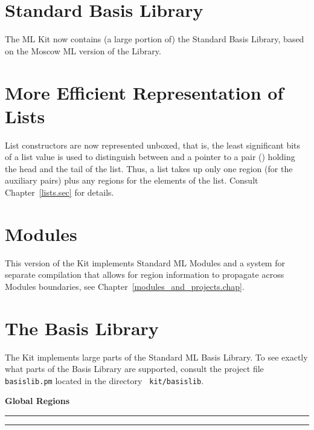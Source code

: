 \documentclass[12pt]{book}
\begin{document}
\section{Standard Basis Library}
The ML Kit now contains (a large portion of) the Standard Basis
Library, based on the Moscow ML version of the Library.
\section{More Efficient Representation of Lists}
 List constructors are now represented unboxed, that is,
the least significant bits of a list value is used to distinguish
between  and a pointer to a pair (\boxml{::}) holding the
head and the tail of the list. Thus, a list takes up only one region
(for the auxiliary pairs) plus any regions for the elements of the
list. Consult Chapter~\ref{lists.sec} for details.

\section{Modules}
This version of the Kit implements Standard ML Modules and a system
for separate compilation that allows for region information to
propagate across Modules boundaries, see
Chapter~\ref{modules_and_projects.chap}.

\section{The Basis Library}
The Kit implements large parts of the Standard ML Basis Library. To
see exactly what parts of the Basis Library are supported, consult the
project file {\tt basislib.pm} located in the directory {\tt
  kit/basislib}. 



\printindex
\begin{center}
\bf Global Regions
\end{center}
\smallskip

\hrule
{}
\hrule
\bigskip
\end{document}

